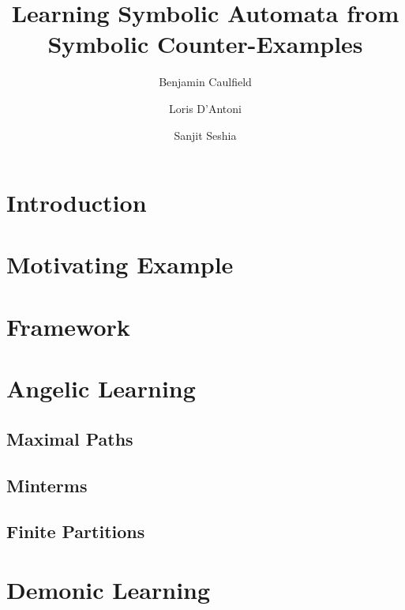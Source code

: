 \documentclass[11pt]{amsart}
\title{Learning Symbolic Automata from Symbolic Counter-Examples}
\author{Benjamin Caulfield}
\author{Loris D'Antoni}
\author{Sanjit Seshia}
\date{}                                           %
\begin{document}
\maketitle

\section{Introduction}

\section{Motivating Example}

\section{Framework}


\section{Angelic Learning}

\subsection{Maximal Paths}

\subsection{Minterms}

\subsection{Finite Partitions}


\section{Demonic Learning}
\end{document}

